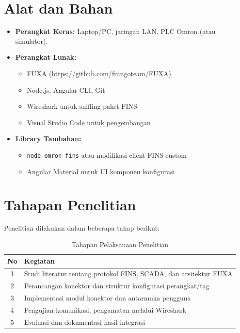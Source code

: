 \section{Alat dan Bahan}
\begin{itemize}
    \item \textbf{Perangkat Keras:} Laptop/PC, jaringan LAN, PLC Omron (atau simulator).
    \item \textbf{Perangkat Lunak:}
          \begin{itemize}
              \item FUXA (https://github.com/frangoteam/FUXA)
              \item Node.js, Angular CLI, Git
              \item Wireshark untuk sniffing paket FINS
              \item Visual Studio Code untuk pengembangan
          \end{itemize}
    \item \textbf{Library Tambahan:}
          \begin{itemize}
              \item \texttt{node-omron-fins} atau modifikasi client FINS custom
              \item Angular Material untuk UI komponen konfigurasi
          \end{itemize}
\end{itemize}

\section{Tahapan Penelitian}
Penelitian dilakukan dalam beberapa tahap berikut:

\begin{table}[H]
    \centering
    \begin{tabular}{|c|p{8cm}|}
        \hline
        \textbf{No} & \textbf{Kegiatan}                                                 \\
        \hline
        1           & Studi literatur tentang protokol FINS, SCADA, dan arsitektur FUXA \\
        2           & Perancangan konektor dan struktur konfigurasi perangkat/tag       \\
        3           & Implementasi modul konektor dan antarmuka pengguna                \\
        4           & Pengujian komunikasi, pengamatan melalui Wireshark                \\
        5           & Evaluasi dan dokumentasi hasil integrasi                          \\
        \hline
    \end{tabular}
    \caption{Tahapan Pelaksanaan Penelitian}
\end{table}

